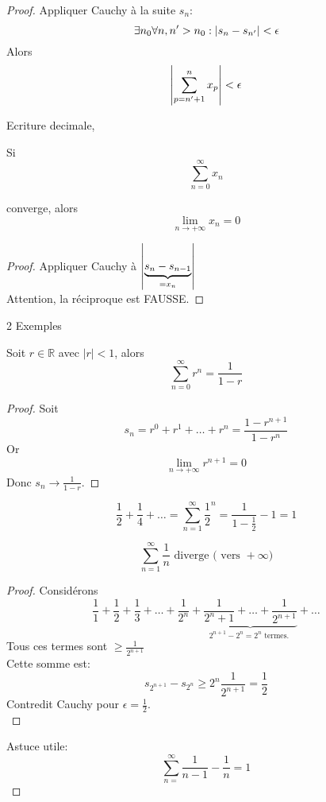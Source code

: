 \documentclass[../main.tex]{subfiles}
\begin{document}
\begin{proof}
Appliquer Cauchy à la suite $s_n$:
\[ 
	\exists n_0 \forall n,n'> n_0: \left\vert s_n -s_{n'} \right\vert < \epsilon
\]
Alors
\[ 
\left\vert \sum_{p=n'+1}^{ n}x_p \right\vert < \epsilon
\]
\begin{exemple}
Ecriture decimale,
\end{exemple}

\begin{propo}
Si 
\[ 
\sum_{n=0}^{ \infty} x_n
\]

converge, alors
\[ 
\lim_{n \to  + \infty} x_n =0
\]

\end{propo}
\begin{proof}
	Appliquer Cauchy à $ \left\vert \underbrace{s_n - s_{n-1}}_{= x_n} \right\vert$\\
	Attention, la réciproque est FAUSSE.
\end{proof}
2 Exemples\\
\begin{propo}
Soit $r \in \mathbb{R}$ avec $|r| <1$, alors
\[ 
\sum_{n=0}^{ \infty} r^{n}= \frac{1}{1-r} 
\]

\end{propo}
\begin{proof}
Soit
\[ 
s_n = r^{0}+ r^{1} + \ldots + r^{n} = \frac{1- r^{n+1}}{ 1 - r^{n}}
\]
Or 
 \[ 
\lim_{n \to  + \infty} r^{n+1} = 0
\]
Donc $ s_n \to \frac{1}{1-r}$.

\end{proof}

\[ 
\frac{1}{2}+ \frac{1}{4}+ \ldots  = \sum_{n=1}^{ \infty } \frac{1}{2}^{n} = \frac{1}{1-\frac{1}{2}} -1 = 1
\]
\begin{propo}
\[ 
	\sum_{n=1}^{ \infty} \frac{1}{n} \text{ diverge ( vers } + \infty)
\]

\end{propo}
\begin{proof}
Considérons
\[ 
\frac{1}{1}+ \frac{1}{2} + \frac{1}{3} + \ldots + \frac{1}{2^{n}} + \underbrace{ \frac{1}{2^{n}+1} + \ldots + \frac{1}{2^{n+1}}}_{2^{n+1}-2^{n} = 2^{n} \text{ termes. } } + \ldots
\]
Tous ces termes sont $\geq \frac{1}{2^{n+1}}$ \\
Cette somme est:
\[ 
s_{2^{n+1}} - s_{2^{n}} \geq 2^{n} \frac{1}{2^{n+1}} = \frac{1}{2}
\]
Contredit Cauchy pour $\epsilon = \frac{1}{2}$.\\

\end{proof}
Astuce utile:\\
\[ 
\sum_{n=}^{ \infty} \frac{1}{n-1}-\frac{1}{n}= 1
\]


\end{proof}
\end{document}

